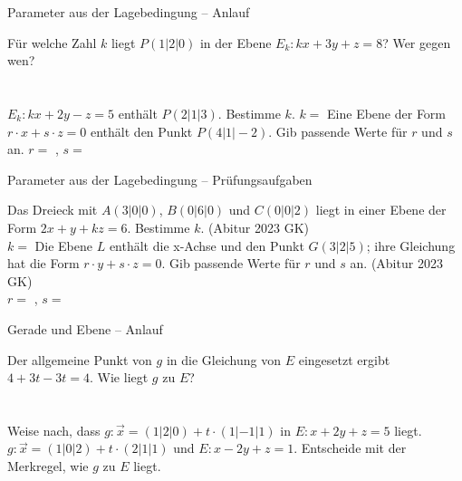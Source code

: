 \begin{aufgabe}{Parameter aus der Lagebedingung – Anlauf}
\begin{teile}
\teil Für welche Zahl $k$ liegt $P(1 | 2 | 0)$ in der Ebene $E_k: kx + 3y + z = 8$? Wer gegen wen? \\  \\  \\ 
\teil $E_k: kx + 2y - z = 5$ enthält $P(2 | 1 | 3)$. Bestimme $k$. $k = $ \leerfeld
\teil Eine Ebene der Form $r \cdot x + s \cdot z = 0$ enthält den Punkt $P(4 | 1 | -2)$. Gib passende Werte für $r$ und $s$ an. $r = $ \leerfeld , $s = $ \leerfeld
\end{teile}
\end{aufgabe}

\begin{aufgabe}{Parameter aus der Lagebedingung – Prüfungsaufgaben}
\begin{teile}
\teil Das Dreieck mit $A(3 | 0 | 0)$, $B(0 | 6 | 0)$ und $C(0 | 0 | 2)$ liegt in einer Ebene der Form $2x + y + kz = 6$. Bestimme $k$. \hfill (Abitur 2023 GK) \\ $k = $ \leerfeld
\teil Die Ebene $L$ enthält die x-Achse und den Punkt $G(3 | 2 | 5)$; ihre Gleichung hat die Form $r \cdot y + s \cdot z = 0$. Gib passende Werte für $r$ und $s$ an. \hfill (Abitur 2023 GK) \\ $r = $ \leerfeld , $s = $ \leerfeld
\end{teile}
\end{aufgabe}

\begin{aufgabe}{Gerade und Ebene – Anlauf}
\begin{teile}
\teil Der allgemeine Punkt von $g$ in die Gleichung von $E$ eingesetzt ergibt $4 + 3t - 3t = 4$. Wie liegt $g$ zu $E$? \\  \\  \\ 
\teil Weise nach, dass $g: \vec{x} = (1 | 2 | 0) + t \cdot (1 | -1 | 1)$ in $E: x + 2y + z = 5$ liegt.
\teil $g: \vec{x} = (1 | 0 | 2) + t \cdot (2 | 1 | 1)$ und $E: x - 2y + z = 1$. Entscheide mit der Merkregel, wie $g$ zu $E$ liegt.
\end{teile}
\end{aufgabe}

